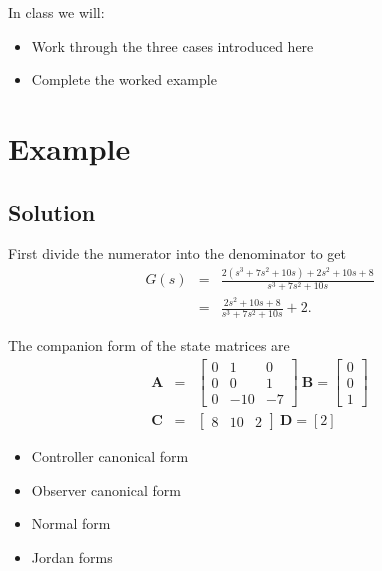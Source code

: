 \ifslidesonly
\begin{slide}

\end{slide}
\begin{slide}
In class we will:
\begin{itemize}
\item Work through the three cases introduced here
\item Complete the worked example
\end{itemize}
\end{slide}
\fi
\section*{Example}



\subsection*{Solution}
First divide the numerator into the denominator to get
\begin{eqnarray*}G(s)&=&\frac{2(s^3 + 7s^2 + 10s) + 2s^2 + 10s + 8}{s^3 + 7s^2 +
10s}\\ &=& \frac{2s^2 + 10s + 8}{s^3 + 7s^2 + 10s} +
2.\end{eqnarray*}

The companion form of the state matrices are
\begin{eqnarray*}\mathbf{A} & = & \left[\begin{array}{ccc}
  0 & 1 & 0 \\
  0 & 0 & 1 \\
  0 & -10 & -7
\end{array}\right]\ \mathbf{B}=\left[\begin{array}{c}
  0 \\
  0 \\
  1
\end{array}\right]\\ \mathbf{C} & = & \left[\begin{array}{ccc}
  8 & 10 & 2
\end{array}\right]\ \mathbf{D}=\left[2\right]\end{eqnarray*}

\begin{slide}
\begin{itemize}
	\item Controller canonical form
	\item Observer canonical form
	\item Normal form
	\item Jordan forms
\end{itemize}
\end{slide}


